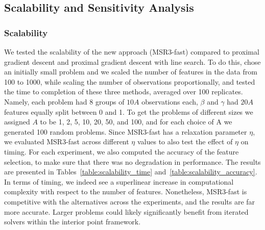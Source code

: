 \begin{table}[h]
\centering
\resizebox{\columnwidth}{!}{}
\caption{\label{table:glmmlasso} Comparison of performance of MSR3-Fast for $\ell_1$ regularizer vs \texttt{glmmLasso}. MSR3-Fast executes 5 times faster in wall time and has higher accuracy of selecting correct covariates. 
}
\end{table}

\subsection{Scalability and Sensitivity Analysis}
\label{ch:msr3_sensitivity_analysis}
\subsubsection{Scalability}
We tested the scalability of the new approach (MSR3-fast) compared to proximal gradient descent and proximal gradient descent with line search. To do this, chose an initially small problem and we scaled the number of features in the data from 100 to 1000, while scaling the number of observations proportionally, and tested the time to completion 
of these three methods, averaged over 100 replicates. Namely, each problem had 8 groups of $10A$ observations each, $\beta$ and $\gamma$ had $20A$ features equally split between 0 and 1. To get the problems of different sizes we assigned $A$ to be 1, 2, 5, 10, 20, 50, and 100, and for each choice of A we generated 100 random problems. Since MSR3-fast has a relaxation parameter $\eta$, we evaluated MSR3-fast across different $\eta$ values to also test the effect of $\eta$ on timing. For each experiment, we also computed 
the accuracy of the feature selection, to make sure that there was no degradation in performance. The results are presented in Tables~\ref{table:scalability_time} and~\ref{table:scalability_accuracy}.  
In terms of timing, we indeed see a superlinear increase in computational complexity with respect to the number of features. Nonetheless, MSR3-fast is competitive with the alternatives across the experiments, and the results are far more accurate. 
Larger problems could likely significantly benefit from iterated solvers within the interior point framework. 


